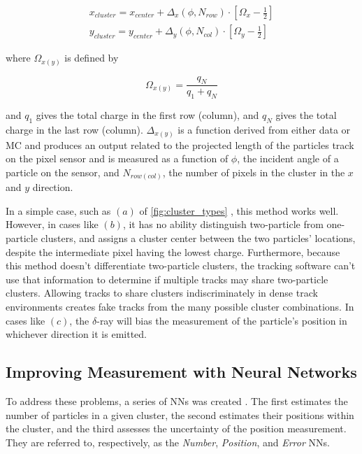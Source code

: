 \begin{eqnarray}
x_{cluster} = x_{center} + \Delta_x(\phi,N_{row}) \cdot \left[ \Omega_x -\frac{1}{2} \right] \\
\label{eq:analogx}
y_{cluster} = y_{center} + \Delta_y(\phi,N_{col}) \cdot \left[ \Omega_y -\frac{1}{2} \right]
\label{eq:analogy}
\end{eqnarray}

where $\Omega_{x(y)}$ is defined by

\begin{equation}
\Omega_{x(y)} = \frac{q_N}{q_1 + q_N}
\end{equation}

and $q_1$ gives the total charge in the first row (column), and $q_N$ gives the total charge in the last row (column). $\Delta_{x(y)}$ is a function derived from either data or \ac{MC} and produces an output related to the projected length of the particles track on the pixel sensor and is measured as a function of $\phi$, the incident angle of a particle on the sensor, and $N_{row(col)}$, the number of pixels in the cluster in the $x$ and $y$ direction. 

In a simple case, such as $(a)$ of \autoref{fig:cluster_types} , this method works well. However, in cases like $(b)$, it has no ability distinguish two-particle from one-particle clusters, and assigns a cluster center between the two particles' locations, despite the intermediate pixel having the lowest charge. Furthermore, because this method doesn't differentiate two-particle clusters, the tracking software can't use that information to determine if multiple tracks may share two-particle clusters. Allowing tracks to share clusters indiscriminately in dense track environments creates fake tracks from the many possible cluster combinations. In cases like $(c)$, the $\delta$-ray will bias the measurement of the particle's position in whichever direction it is emitted. 

\subsection{Improving Measurement with Neural Networks}

To address these problems, a series of \acp{NN} was created \cite{PERF-2012-05}. The first estimates the number of particles in a given cluster, the second estimates their positions within the cluster, and the third assesses the uncertainty of the position measurement. They are referred to, respectively, as the \textit{Number}, \textit{Position}, and \textit{Error} \acp{NN}.

